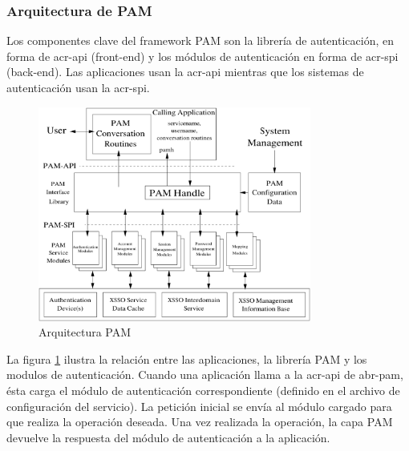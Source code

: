 \documentclass[titlepage, 12pt, a4paper]{article}
\begin{document}
\subsubsection{Arquitectura de PAM}
Los componentes clave del framework PAM son la librería de autenticación, en forma de \gls{acr-api} (\gls{front-end}) y los módulos de autenticación en forma de \gls{acr-spi} (\gls{back-end}). Las aplicaciones usan la \gls{acr-api} mientras que los sistemas de autenticación usan la \gls{acr-spi}.
\begin{figure}[H]
    \centering
    \includegraphics[width=0.8\textwidth]{Media/PAMFramework.png}
    \caption{Arquitectura PAM}
    \label{fig:arquitecturaPAM}
\end{figure}
La figura \ref{fig:arquitecturaPAM} ilustra la relación entre las aplicaciones, la librería PAM y los modulos de autenticación. Cuando una aplicación llama a la \gls{acr-api} de \gls{abr-pam}, ésta carga el módulo de autenticación correspondiente (definido en el archivo de configuración del servicio). La petición inicial se envía al módulo cargado para que realiza la operación deseada. Una vez realizada la operación, la capa PAM devuelve la respuesta del módulo de autenticación a la aplicación\cite{PAM}.
\end{document}
